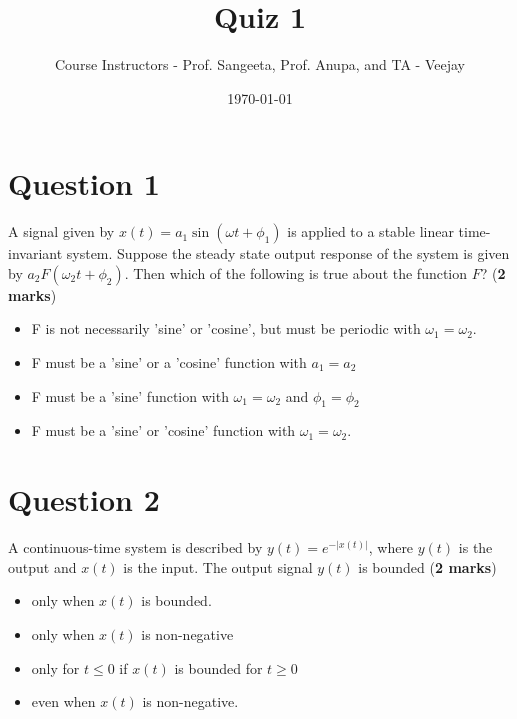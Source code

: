 \documentclass[10pt]{article}
\title{Quiz 1}
\author{Course Instructors - Prof. Sangeeta, Prof. Anupa, and TA - Veejay}
\date{\today}
\begin{document}
    \maketitle
    
    \section*{Question 1}
    A signal given by $x(t) = a_1\sin(\omega t+\phi_1)$ is applied to a stable linear time-invariant system. Suppose the steady state output response of the system is given by $a_2F(\omega_2 t +\phi_2)$. Then which of the following is true about the function $F$? (\textbf{2 marks})
    \begin{itemize}
        \item F is not necessarily 'sine' or 'cosine', but must be periodic with $\omega_1=\omega_2$.
        \item F must be a 'sine' or a 'cosine' function with $a_1=a_2$
        \item F must be a 'sine' function with $\omega_1=\omega_2$ and $\phi_1=\phi_2$
        \item F must be a 'sine' or 'cosine' function with $\omega_1=\omega_2$.
    \end{itemize}
    
    \section*{Question 2}
    A continuous-time system is described by $y(t)=e^{-|x(t)|}$, where $y(t)$ is the output and $x(t)$ is the input. The output signal $y(t)$ is bounded (\textbf{2 marks})
    \begin{itemize}
        \item only when $x(t)$ is bounded.
        \item only when $x(t)$ is non-negative
        \item only for $t \leq 0$ if $x(t)$ is bounded for $t \geq 0$
        \item even when $x(t)$ is non-negative.
    \end{itemize}
    
    
    
\end{document}

